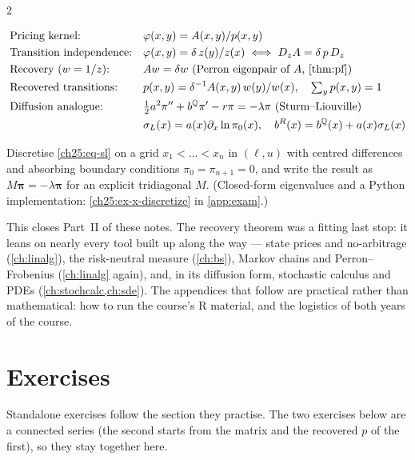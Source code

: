 \begin{paracol}{2}
\begin{keyformulas}
\begin{align*}
&\text{Pricing kernel:} && \varphi(x,y)=A(x,y)/p(x,y)\\
&\text{Transition independence:} && \varphi(x,y)=\delta\,z(y)/z(x)\iff D_zA=\delta\,p\,D_z\\
&\text{Recovery ($w=1/z$):} && Aw=\delta w \ \text{(Perron eigenpair of }A\text{, \cref{thm:pf})}\\
&\text{Recovered transitions:} && p(x,y)=\delta^{-1}A(x,y)\,w(y)/w(x),\quad\textstyle\sum_yp(x,y)=1\\
&\text{Diffusion analogue:} && \tfrac12a^2\pi''+b^\Q\pi'-r\pi=-\lambda\pi\ \text{(Sturm--Liouville)}\\
  &&& \sigma_L(x)=a(x)\partial_x\ln\pi_0(x),\quad b^R(x)=b^\Q(x)+a(x)\sigma_L(x)
\end{align*}
\end{keyformulas}

\begin{exercise}\label{ch25:ex-x-discretize-short}
Discretise \eqref{ch25:eq-sl} on a grid $x_1<\dots<x_n$ in $(\ell,u)$ with centred differences and absorbing boundary conditions $\pi_0=\pi_{n+1}=0$, and write the result as $M\bm\pi=-\lambda\bm\pi$ for an explicit tridiagonal $M$. (Closed-form eigenvalues and a Python implementation: \cref{ch25:ex-x-discretize} in \cref{app:exam}.)
\end{exercise}

\begin{remark}
This closes Part~II of these notes. The recovery theorem was a fitting last stop: it leans on nearly every
tool built up along the way --- state prices and no-arbitrage (\cref{ch:linalg}), the risk-neutral measure
(\cref{ch:bs}), Markov chains and Perron--Frobenius (\cref{ch:linalg} again), and, in its diffusion form,
stochastic calculus and PDEs (\cref{ch:stochcalc,ch:sde}). The appendices that follow are practical rather
than mathematical: how to run the course's \textsf{R} material, and the logistics of both years of the
course.
\end{remark}

\section*{Exercises}
Standalone exercises follow the section they practise. The two exercises below are a connected series (the second starts from the matrix and the recovered $p$ of the first), so they stay together here.


\end{paracol}
